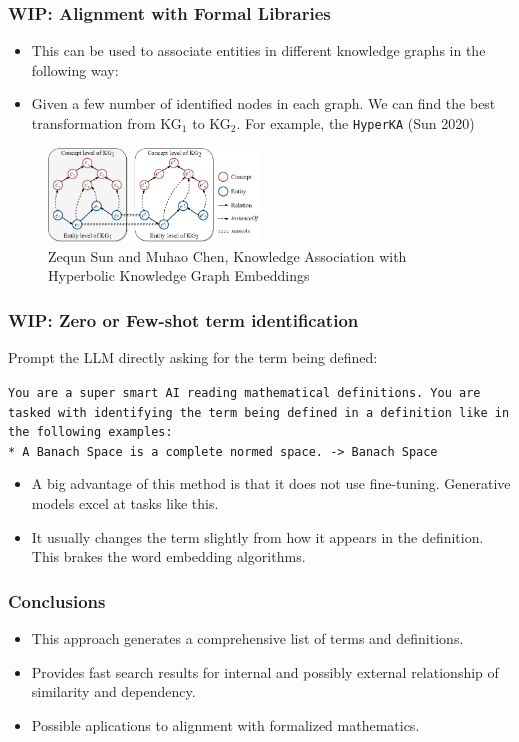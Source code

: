 \documentclass[10pt]{beamer}
\begin{document}
\begin{frame}
    \frametitle{WIP: Alignment with Formal Libraries}
    \begin{itemize}
        \item This can be used to associate entities in different knowledge graphs in the following way:
            \pause
        \item Given a few number of identified nodes in each graph. We can find the best transformation from KG$_1$ to KG$_2$. For example, 
            the \texttt{HyperKA} (Sun 2020)
    \end{itemize}
            \begin{figure}
                \centering
                \includegraphics[width=0.5\textwidth]{../Images/example.png}
                \caption{Zequn Sun and Muhao Chen, Knowledge Association with Hyperbolic Knowledge Graph Embeddings}
            \end{figure}
\end{frame}

\begin{frame}
    \frametitle{WIP: Zero or Few-shot term identification}
Prompt the LLM directly asking for the term being defined:
\begin{example}
    \texttt{You are a super smart AI reading mathematical definitions. You are tasked with identifying the term being defined in a definition like in the following examples:\\
    * A Banach Space is a complete normed space. -> Banach Space}
\end{example}
\pause
    \begin{itemize}
        \item A big advantage of this method is that it does not use fine-tuning. Generative models excel at tasks like this.
            \pause
        \item  It usually changes the term slightly from how it appears in the definition. This brakes the word embedding algorithms.
    \end{itemize}
\end{frame}


\begin{frame}
    \frametitle{Conclusions}
    \begin{itemize}
        \item This approach  generates a comprehensive list of terms and definitions.
        \item Provides fast search results for internal and possibly external relationship of similarity and dependency.
        \item Possible aplications to alignment with formalized mathematics.
    \end{itemize}
\end{frame}

\begin{frame}
\titlepage
\end{frame}
\end{document}
